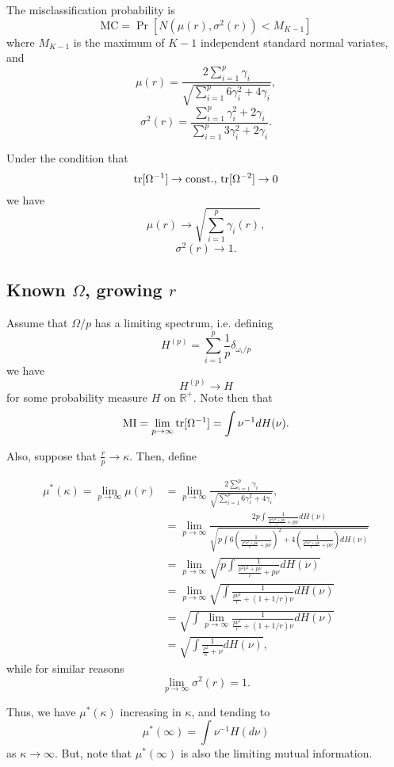 \documentclass[12pt]{article}
\begin{document}
The misclassification probability is
\[
\text{MC} = \Pr[N(\mu(r), \sigma^2(r)) < M_{K-1}]
\]
where $M_{K-1}$ is the maximum of $K-1$ independent standard normal variates,
and
\[
\mu(r) = \frac{2\sum_{i=1}^p \gamma_i}{\sqrt{\sum_{i=1}^p 6\gamma_i^2 + 4 \gamma_i}},
\]
\[
\sigma^2(r) = \frac{\sum_{i=1}^p \gamma_i ^2 + 2\gamma_i}{\sum_{i=1}^p 3\gamma_i^2 + 2\gamma_i}.
\]

Under the condition that
\[
\text{tr}[\Omega^{-1}] \to \text{const., }\text{tr}[\Omega^{-2}] \to 0
\]
we have
\[
\mu(r) \to \sqrt{\sum_{i=1}^p \gamma_i(r)},
\]
\[
\sigma^2(r) \to 1.
\]

\subsection{Known $\Omega$, growing $r$}

Assume that $\Omega/p$ has a limiting spectrum, i.e.
defining
\[
H^{(p)} = \sum_{i=1}^p \frac{1}{p}\delta_{\omega_i/p}
\]
we have
\[
H^{(p)} \to H
\]
for some probability measure $H$ on $\mathbb{R}^+$.
Note then that
\[
\text{MI} = \lim_{p\to\infty} \text{tr}[\Omega^{-1}] = \int \nu^{-1} dH(\nu).
\]

Also, suppose that $\frac{r}{p} \to \kappa$.
Then, define

\begin{align*}
\mu^*(\kappa) = \lim_{p \to \infty} \mu(r) &= \lim_{p \to \infty} \frac{2\sum_{i=1}^p \gamma_i}{\sqrt{\sum_{i=1}^p 6\gamma_i^2 + 4 \gamma_i}},
\\&= \lim_{p \to \infty} \frac{2p \int \frac{1}{\frac{p^2 \nu^2 + p\nu}{r} + p\nu}dH(\nu)}{
\sqrt{
p\int 6\left(\frac{1}{\frac{p^2 \nu^2 + p\nu}{r} + p\nu}\right)^2 + 4 \left(\frac{1}{\frac{p^2 \nu^2 + p\nu}{r} + p\nu}\right)dH(\nu)
}
}
\\&= \lim_{p \to \infty} \sqrt{p \int \frac{1}{\frac{p^2 \nu^2 + p\nu}{r} + p\nu}dH(\nu)}
\\&= \lim_{p \to \infty} \sqrt{\int \frac{1}{\frac{p \nu^2}{r} + (1 + 1/r)\nu}dH(\nu)}
\\&= \sqrt{\int \lim_{p \to \infty} \frac{1}{\frac{p \nu^2}{r} + (1 + 1/r)\nu}dH(\nu)}
\\&= \sqrt{\int \frac{1}{\frac{\nu^2}{\kappa} + \nu} dH(\nu)},
\end{align*}
while for similar reasons
\[
\lim_{p \to \infty} \sigma^2(r) = 1.
\]

Thus, we have $\mu^*(\kappa)$ increasing in $\kappa$, and tending to
\[
\mu^*(\infty) = \int \nu^{-1} H(d\nu)
\]
as $\kappa \to \infty$.
But, note that $\mu^*(\infty)$ is also the limiting mutual information.
\end{document}
